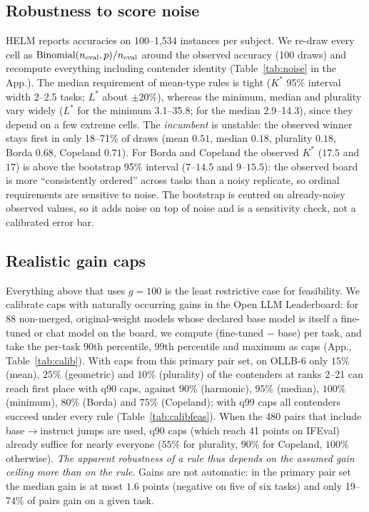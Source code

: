 \documentclass{article}
\theoremstyle{remark}
\newcommand{\K}{K^\ast}
\newcommand{\Lm}{L^\ast}
\begin{document}
\subsection{Robustness to score noise}\label{sec:noise}
HELM reports accuracies on 100--1,534 instances per subject. We re-draw every cell as $\mathrm{Binomial}(n_{\rm eval},p)/n_{\rm eval}$ around the observed accuracy (100 draws) and recompute everything including contender identity (Table~\ref{tab:noise} in the App.). The median requirement of mean-type rules is tight ($K^\ast$ 95\% interval width 2--2.5 tasks; $\Lm$ about $\pm20\%$), whereas the minimum, median and plurality vary widely ($\Lm$ for the minimum 3.1--35.8; for the median 2.9--14.3), since they depend on a few extreme cells. The \emph{incumbent} is unstable: the observed winner stays first in only 18--71\% of draws (mean $0.51$, median $0.18$, plurality $0.18$, Borda $0.68$, Copeland $0.71$). For Borda and Copeland the observed $\K$ ($17.5$ and $17$) is above the bootstrap 95\% interval ($7$--$14.5$ and $9$--$15.5$): the observed board is more ``consistently ordered'' across tasks than a noisy replicate, so ordinal requirements are sensitive to noise. The bootstrap is centred on already-noisy observed values, so it adds noise on top of noise and is a sensitivity check, not a calibrated error bar.

\subsection{Realistic gain caps}\label{sec:calib}
Everything above that uses $g=100$ is the least restrictive case for feasibility. We calibrate caps with naturally occurring gains in the Open LLM Leaderboard: for 88 non-merged, original-weight models whose declared base model is itself a fine-tuned or chat model on the board, we compute (fine-tuned $-$ base) per task, and take the per-task 90th percentile, 99th percentile and maximum as caps (App., Table~\ref{tab:calib}). With caps from this primary pair set, on OLLB-6 only $15\%$ (mean), $25\%$ (geometric) and $10\%$ (plurality) of the contenders at ranks 2--21 can reach first place with q90 caps, against $90\%$ (harmonic), $95\%$ (median), $100\%$ (minimum), $80\%$ (Borda) and $75\%$ (Copeland); with q99 caps all contenders succeed under every rule (Table~\ref{tab:calibfeas}). When the 480 pairs that include base$\to$instruct jumps are used, q90 caps (which reach 41 points on IFEval) already suffice for nearly everyone ($55$\% for plurality, $90$\% for Copeland, $100$\% otherwise). \emph{The apparent robustness of a rule thus depends on the assumed gain ceiling more than on the rule}. Gains are not automatic: in the primary pair set the median gain is at most $1.6$ points (negative on five of six tasks) and only 19--74\% of pairs gain on a given task.
\end{document}
